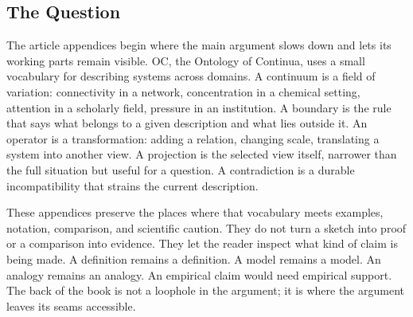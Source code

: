\documentclass[11pt,a4paper,openany]{book}
\begin{document}
\subsection{The Question}
The article appendices begin where the main argument slows down and lets its working parts remain visible. OC, the Ontology of Continua, uses a small vocabulary for describing systems across domains. A continuum is a field of variation: connectivity in a network, concentration in a chemical setting, attention in a scholarly field, pressure in an institution. A boundary is the rule that says what belongs to a given description and what lies outside it. An operator is a transformation: adding a relation, changing scale, translating a system into another view. A projection is the selected view itself, narrower than the full situation but useful for a question. A contradiction is a durable incompatibility that strains the current description. \cite{raf_networks,bak_soc}\par
These appendices preserve the places where that vocabulary meets examples, notation, comparison, and scientific caution. They do not turn a sketch into proof or a comparison into evidence. They let the reader inspect what kind of claim is being made. A definition remains a definition. A model remains a model. An analogy remains an analogy. An empirical claim would need empirical support. The back of the book is not a loophole in the argument; it is where the argument leaves its seams accessible.\par
\end{document}
